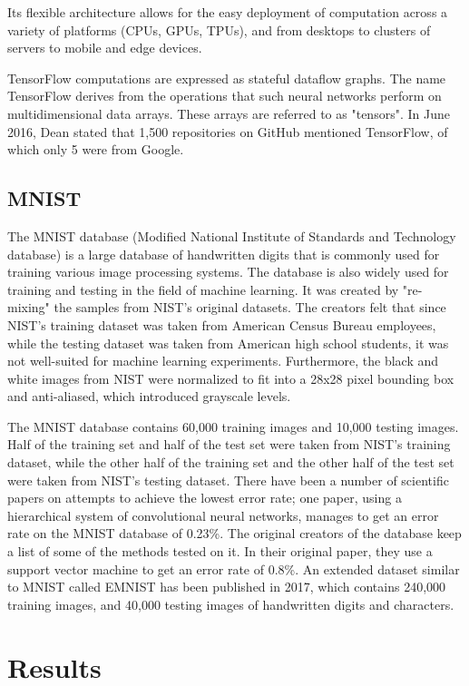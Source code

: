 \documentclass{article}
\begin{document}
Its flexible architecture allows for the easy deployment of computation across a variety of platforms (CPUs, GPUs, TPUs), and from desktops to clusters of servers to mobile and edge devices.

TensorFlow computations are expressed as stateful dataflow graphs. The name TensorFlow derives from the operations that such neural networks perform on multidimensional data arrays. These arrays are referred to as "tensors". In June 2016, Dean stated that 1,500 repositories on GitHub mentioned TensorFlow, of which only 5 were from Google.

\subsection{MNIST}

The MNIST database (Modified National Institute of Standards and Technology database) is a large database of handwritten digits that is commonly used for training various image processing systems. The database is also widely used for training and testing in the field of machine learning. It was created by "re-mixing" the samples from NIST's original datasets. The creators felt that since NIST's training dataset was taken from American Census Bureau employees, while the testing dataset was taken from American high school students, it was not well-suited for machine learning experiments. Furthermore, the black and white images from NIST were normalized to fit into a 28x28 pixel bounding box and anti-aliased, which introduced grayscale levels.

The MNIST database contains 60,000 training images and 10,000 testing images. Half of the training set and half of the test set were taken from NIST's training dataset, while the other half of the training set and the other half of the test set were taken from NIST's testing dataset. There have been a number of scientific papers on attempts to achieve the lowest error rate; one paper, using a hierarchical system of convolutional neural networks, manages to get an error rate on the MNIST database of 0.23\%. The original creators of the database keep a list of some of the methods tested on it. In their original paper, they use a support vector machine to get an error rate of 0.8\%. An extended dataset similar to MNIST called EMNIST has been published in 2017, which contains 240,000 training images, and 40,000 testing images of handwritten digits and characters.

\section{Results}
\end{document}
